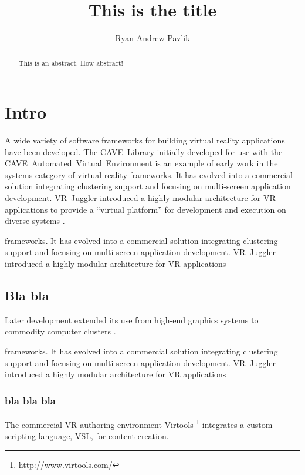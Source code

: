 \documentclass[draftcls]{rpisudiss}
\title{This is the title}
\author{Ryan Andrew Pavlik}
\begin{document}
\thispagestyle{empty}
\maketitle

\tableofcontents{}
\listoffigures
\listoftables

\begin{abstract}
This is an abstract. How abstract!
\end{abstract}

\mainmatter

\chapter{Intro}


A wide variety of software frameworks for building virtual reality
applications have been developed. The CAVE~Library initially developed
for use with the CAVE~Automated~Virtual~Environment \cite{Cruz-Neira1993}
is an example of early work in the systems category of virtual reality
frameworks. It has evolved into a commercial solution integrating
clustering support and focusing on multi-screen application development.
VR~Juggler introduced a highly modular architecture for VR applications
to provide a ``virtual platform'' for development and execution
on diverse systems \cite{Bierbaum2001,Bierbaum2005}.

frameworks. It has evolved into a commercial solution integrating
clustering support and focusing on multi-screen application development.
VR~Juggler introduced a highly modular architecture for VR applications

\section{Bla bla}
Later development
extended its use from high-end graphics systems to commodity computer
clusters \cite{Allard2002,Bierbaum2005}.


frameworks. It has evolved into a commercial solution integrating
clustering support and focusing on multi-screen application development.
VR~Juggler introduced a highly modular architecture for VR applications

\subsection{bla bla bla}
The commercial
VR authoring environment Virtools%
\footnote{\url{http://www.virtools.com/}%
} integrates a custom scripting language, VSL, for content creation.
\end{document}
